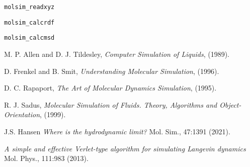 \documentclass[11pt]{article}
\begin{document}
\noindent \verb!molsim_readxyz!

\noindent \verb!molsim_calcrdf!

\noindent \verb!molsim_calcmsd!

\noindent 



\clearpage

\begin{thebibliography}{9}

  M. P. Allen and D. J. Tildesley, \emph{Computer Simulation of Liquids}, (1989). 

  D. Frenkel and B. Smit, \emph{Understanding Molecular Simulation}, (1996).

 D. C. Rapaport, \emph{The Art of Molecular Dynamics Simulation}, (1995).

  R. J. Sadus, \emph{Molecular Simulation of Fluids. Theory, Algorithms and
    Object-Orientation}, (1999).

  J.S. Hansen \emph{Where is the hydrodynamic limit?} Mol. Sim., 47:1391 (2021).
 
   \emph{A simple and effective Verlet-type algorithm for simulating Langevin dynamics} 
   Mol. Phys., 111:983 (2013).
  
\end{thebibliography}

\appendix

\clearpage
\end{document}
